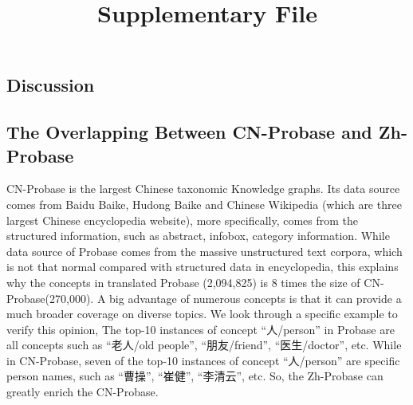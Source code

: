 \documentclass[letterpaper]{article} %
\newcommand{\zhpro}{Zh-Probase\xspace}
\begin{document}
	\title{Supplementary File}
	\maketitle
	
	\begin{CJK}{UTF8}{gkai}



	
\section{Discussion}

\subsection{The Overlapping Between CN-Probase and Zh-Probase}
CN-Probase is the largest  Chinese taxonomic Knowledge graphs.
Its data source comes from Baidu Baike, Hudong Baike and Chinese Wikipedia (which are three largest Chinese encyclopedia website), more specifically, comes from the structured information, such as abstract, infobox, category information. 
While data source of Probase comes from the massive unstructured text corpora, which is not that normal compared with structured data in encyclopedia, this explains why the concepts in translated Probase (2,094,825) is 8 times the size of CN-Probase(270,000). 
A big advantage of numerous concepts is that it can provide a much broader coverage on diverse topics. We look through a specific example to verify this opinion, The top-10 instances of concept ``人/person'' in Probase are all concepts such as ``老人/old people'', ``朋友/friend'', ``医生/doctor'', etc. 
While in CN-Probase, seven of the top-10 instances of concept ``人/person'' are specific person names, such as ``曹操'', ``崔健'', ``李清云'', etc.
So, the \zhpro can greatly enrich the CN-Probase.




\end{CJK}
\end{document}
